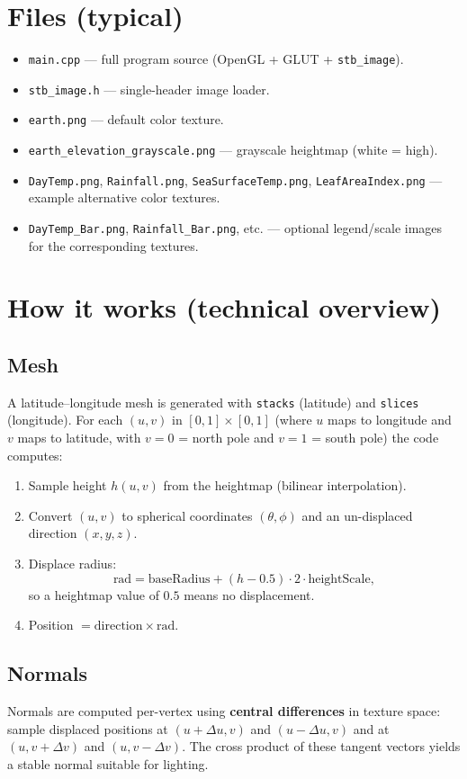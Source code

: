 \documentclass[11pt]{article}
\begin{document}
\section{Files (typical)}
\begin{itemize}
  \item \verb|main.cpp| — full program source (OpenGL + GLUT + \verb|stb_image|).
  \item \verb|stb_image.h| — single-header image loader.
  \item \verb|earth.png| — default color texture.
  \item \verb|earth_elevation_grayscale.png| — grayscale heightmap (white = high).
  \item \verb|DayTemp.png|, \verb|Rainfall.png|, \verb|SeaSurfaceTemp.png|, \verb|LeafAreaIndex.png| — example alternative color textures.
  \item \verb|DayTemp_Bar.png|, \verb|Rainfall_Bar.png|, etc. — optional legend/scale images for the corresponding textures.
\end{itemize}

\section{How it works (technical overview)}

\subsection*{Mesh}
A latitude--longitude mesh is generated with \texttt{stacks} (latitude) and \texttt{slices} (longitude). For each \((u,v)\) in \([0,1]\times[0,1]\) (where \(u\) maps to longitude and \(v\) maps to latitude, with \(v=0\) = north pole and \(v=1\) = south pole) the code computes:
\begin{enumerate}
  \item Sample height \(h(u,v)\) from the heightmap (bilinear interpolation).
  \item Convert \((u,v)\) to spherical coordinates \((\theta,\phi)\) and an un-displaced direction \((x,y,z)\).
  \item Displace radius:
  \[
    \text{rad} = \text{baseRadius} + (h - 0.5)\cdot 2 \cdot \text{heightScale},
  \]
  so a heightmap value of \(0.5\) means no displacement.
  \item Position \(= \text{direction} \times \text{rad}\).
\end{enumerate}

\subsection*{Normals}
Normals are computed per-vertex using \textbf{central differences} in texture space: sample displaced positions at \((u+\Delta u,v)\) and \((u-\Delta u,v)\) and at \((u,v+\Delta v)\) and \((u,v-\Delta v)\). The cross product of these tangent vectors yields a stable normal suitable for lighting.
\end{document}
